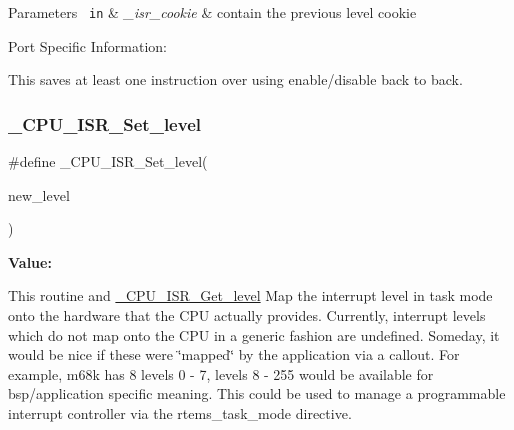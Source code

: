 \begin{DoxyParams}[1]{Parameters}
\mbox{\texttt{ in}}  & {\em \+\_\+isr\+\_\+cookie} & contain the previous level cookie\\
\hline
\end{DoxyParams}
Port Specific Information\+:

This saves at least one instruction over using enable/disable back to back. \mbox{\label{group__RTEMSScoreCPUV850CPUInterrupt_gaed8717a2f15938d954c7124cd11e899f}} 
\subsubsection{\texorpdfstring{\_CPU\_ISR\_Set\_level}{\_CPU\_ISR\_Set\_level}}
{\footnotesize\ttfamily \#define \+\_\+\+C\+P\+U\+\_\+\+I\+S\+R\+\_\+\+Set\+\_\+level(\begin{DoxyParamCaption}\item[{}]{new\+\_\+level }\end{DoxyParamCaption})}

{\bfseries Value\+:}
\begin{DoxyCode}{0}
\DoxyCodeLine{\textcolor{keywordflow}{do} \{ \(\backslash\)}

\end{DoxyCode}
This routine and \mbox{\hyperlink{group__RTEMSScoreCPUARM_ga1d9dcab9170d532b6634a5620385adbd}{\+\_\+\+C\+P\+U\+\_\+\+I\+S\+R\+\_\+\+Get\+\_\+level}} Map the interrupt level in task mode onto the hardware that the C\+PU actually provides. Currently, interrupt levels which do not map onto the C\+PU in a generic fashion are undefined. Someday, it would be nice if these were \char`\"{}mapped\char`\"{} by the application via a callout. For example, m68k has 8 levels 0 -\/ 7, levels 8 -\/ 255 would be available for bsp/application specific meaning. This could be used to manage a programmable interrupt controller via the rtems\+\_\+task\+\_\+mode directive.

